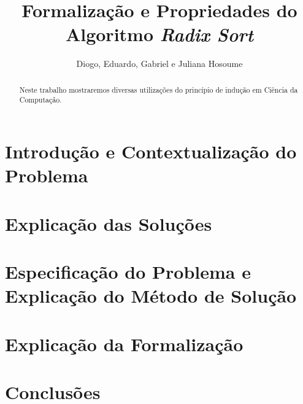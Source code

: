 \documentclass[a5paper, 10pt]{article}
\title{\LARGE \bf
Formalização e Propriedades do Algoritmo \textit{Radix Sort}
}
\author{Diogo, Eduardo, Gabriel e Juliana Hosoume}
\begin{document}
\maketitle

\begin{abstract}

Neste trabalho mostraremos diversas utilizações do princípio de indução em Ciência da Computação.

\end{abstract}

\section{Introdução e Contextualização do Problema}

\section{Explicação das Soluções}

\section{Especificação do Problema e Explicação do Método de Solução}

\section{Explicação da Formalização}

\section{Conclusões}
\end{document}
